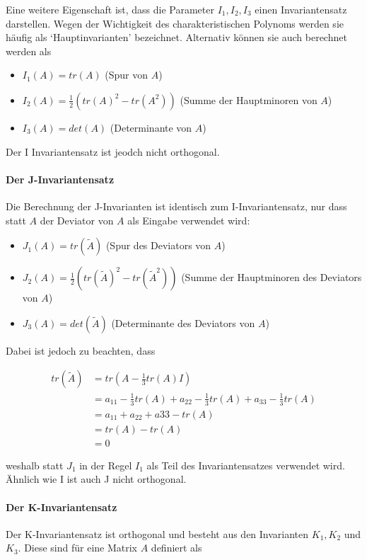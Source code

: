 \documentclass[a4paper,fontsize=12pt,toc=bib,halfparskip]{scrartcl}
\begin{document}
Eine weitere Eigenschaft ist, dass die Parameter $I_1, I_2, I_3$ einen Invariantensatz darstellen. Wegen der Wichtigkeit des charakteristischen Polynoms werden sie h\"aufig als `Hauptinvarianten' bezeichnet. Alternativ k\"onnen sie auch berechnet werden als

\begin{itemize}
	\item $I_1(A) = tr(A)$ (Spur von $A$)
	\item $I_2(A) = \frac{1}{2}(tr(A)^2 - tr(A^2))$ (Summe der Hauptminoren von $A$)
	\item $I_3(A) = det(A)$ (Determinante von $A$)
\end{itemize}
Der I Invariantensatz ist jeodch nicht orthogonal.

\paragraph{Der J-Invariantensatz}
 Die Berechnung der J-Invarianten ist identisch zum I-Invariantensatz, nur dass statt $A$ der Deviator von $A$ als Eingabe verwendet wird:

\begin{itemize}
	\item $J_1(A) = tr(\tilde{A})$ (Spur des Deviators von $A$)
	\item $J_2(A) = \frac{1}{2}(tr(\tilde{A})^2 - tr(\tilde{A}^2))$ (Summe der Hauptminoren des Deviators von $A$)
\item $J_3(A) = det(\tilde{A})$ (Determinante des Deviators von $A$)
\end{itemize}

Dabei ist jedoch zu beachten, dass

\begin{equation}
	\begin{split}
	tr(\tilde{A}) &= tr(A - \frac{1}{3}tr(A)I)\\
	&= a_{11} - \frac{1}{3} tr(A) + a_{22} - \frac{1}{3} tr(A) + a_{33} - \frac{1}{3} tr(A)\\
	&= a_{11} + a_{22} + a{33} - tr(A)\\
	&= tr(A) - tr(A)\\
	&= 0
	\end{split}
\end{equation}

weshalb statt $J_1$ in der Regel $I_1$ als Teil des Invariantensatzes verwendet wird. \"Ahnlich wie I ist auch J nicht orthogonal.

\paragraph{Der K-Invariantensatz}
Der K-Invariantensatz ist orthogonal und besteht aus den Invarianten $K_1, K_2$ und $K_3$. Diese sind f\"ur eine Matrix $A$ definiert als
\end{document}
